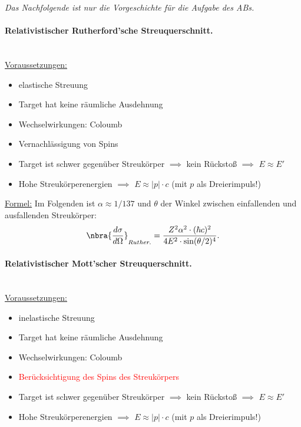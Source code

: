 \documentclass{subfiles}
\begin{document}
        \subaufgabe{}   
                \textit{Das Nachfolgende ist nur die Vorgeschichte für die Aufgabe des ABs.}
                \paragraph{Relativistischer Rutherford'sche Streuquerschnitt.}\, \\

                \noindent\underline{Voraussetzungen:}
                \begin{itemize}
                        \item elastische Streuung
                        \item Target hat keine räumliche Ausdehnung
                        \item Wechselwirkungen: Coloumb
                        \item Vernachlässigung von Spins 
                        \item Target ist schwer gegenüber Streukörper $\implies$ kein Rückstoß $\implies$ $E \approx E'$ 
                        \item Hohe Streukörperenergien $\implies$ $E \approx \vert p\vert\cdot c$ (mit $p$ als Dreierimpuls!)
                \end{itemize}

                \noindent\underline{Formel:} Im Folgenden ist $\alpha\approx 1/137$ und $\theta$ der Winkel zwischen einfallenden und ausfallenden Streukörper:
                \[
                        \nbra{\frac{d\sigma}{d\Omega}}_{Ruther.} = \frac{Z^2\alpha^2\cdot (\hbar c)^2}{4E^2\cdot\sin(\theta/2)^4}.        
                \]


                \paragraph{Relativistischer Mott'scher Streuquerschnitt.}\, \\

                \noindent\underline{Voraussetzungen:}
                \begin{itemize}
                        \item inelastische Streuung
                        \item Target hat keine räumliche Ausdehnung
                        \item Wechselwirkungen: Coloumb
                        \item \textcolor{red}{Berücksichtigung des Spins des Streukörpers}
                        \item Target ist schwer gegenüber Streukörper $\implies$ kein Rückstoß $\implies$ $E \approx E'$ 
                        \item Hohe Streukörperenergien $\implies$ $E \approx \vert p\vert\cdot c$ (mit $p$ als Dreierimpuls!)
                \end{itemize}
\end{document}
